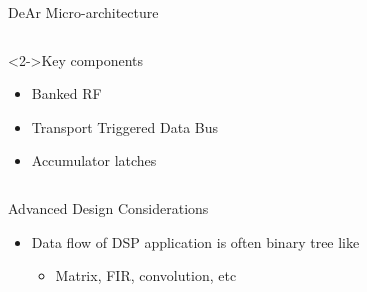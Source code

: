 \documentclass{beamer}
\begin{document}
\begin{CJK}{UTF8}{bkai}
\begin{frame}{DeAr Micro-architecture}
\begin{columns}
                    \begin{column}{0.35\textwidth}
                        \begin{block}<2->{Key components}
                            \begin{itemize}
                                \item <3->{Banked RF}
                                \item <4->{Transport Triggered Data Bus}
                                \item <5->{Accumulator latches}
                            \end{itemize}    
                        \end{block}
                    \end{column}
                \end{columns}
            \end{frame}

            \begin{frame}{Advanced Design Considerations}
                \begin{itemize}
                \item Data flow of DSP application is often binary tree like 
                    \begin{itemize}
                        \item Matrix, FIR, convolution, etc
                    \end{itemize}
                \end{itemize}

            \end{frame}


\end{CJK}
\end{document}
